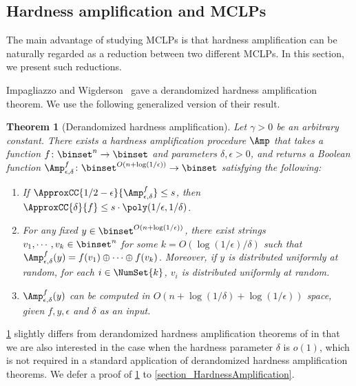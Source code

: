 \documentclass[11pt]{article}
\numberwithin{equation}{section}
\newtheorem{theorem}{Theorem}[section]
\theoremstyle{definition}
\theoremstyle{plain}
\begin{document}
%
%
%


\subsection{Hardness amplification and MCLPs}
\label{section_KtandHSG}

The main advantage of studying MCLPs is that
hardness amplification can be naturally regarded as a reduction
between two different MCLPs.
In this section, we present such reductions.

Impagliazzo and Wigderson~\cite{ImpagliazzoW97_stoc_conf} gave a derandomized hardness amplification theorem.
We use the following generalized version of their result.
\begin{theorem}
  [Derandomized hardness amplification]
  \label{lemma_HardnessAmplification}
  Let $\gamma > 0$ be an arbitrary constant.
  There exists a hardness amplification procedure $\Amp$
  that takes a function $f \colon \binset^n \to \binset$ and parameters $\delta, \epsilon > 0$,
  and returns
  a Boolean function
  $\Amp_{\epsilon, \delta}^f \colon \binset^{O(n + \log (1/\epsilon))} \to \binset$
  satisfying the following:
  \begin{enumerate}
    \item
          \label{item_AmpApprox}
          If $\ApproxCC{1/2 - \epsilon}{\Amp_{\epsilon, \delta}^f} \le s$,
          then
          $\ApproxCC{\delta}{f} \le s \cdot \poly(1/\epsilon, 1/\delta)$.
    \item  \label{item_AmpXOR}
          For any fixed $y \in \binset^{O(n + \log (1 / \epsilon))}$,
          there exist strings $v_1, \cdots, v_k \in \binset^{n}$
          for some $k = O(\log (1 / \epsilon) / \delta)$
          such that
          $\Amp_{\epsilon, \delta}^f(y) =  f(v_1) \oplus \cdots \oplus f(v_k)$.
          Moreover, if $y$ is distributed uniformly at random,
          for each $i \in \NumSet{k}$,
          $v_i$ is distributed uniformly at random.
    \item \label{item_AmpKS}
          $\Amp_{\epsilon, \delta}^f(y)$ can be computed in $O(n + \log (1 / \delta) + \log (1 / \epsilon))$ space,
          given $f, y, \epsilon$ and $\delta$ as an input.
  \end{enumerate}
\end{theorem}
\cref{lemma_HardnessAmplification} slightly differs from derandomized hardness amplification theorems of \cite{ImpagliazzoW97_stoc_conf, HealyVV06_siamcomp_journals} in that
we are also interested in the case when the hardness parameter $\delta$ is $o(1)$,
which is not required in a standard application of derandomized hardness amplification theorems.
We defer a proof of \cref{lemma_HardnessAmplification} to \cref{section_HardnessAmplification}.
%
\end{document}
